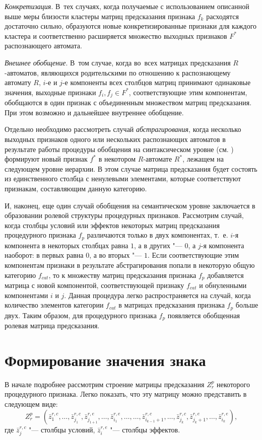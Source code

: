 \documentclass[a4paper, 12pt]{article}
\numberwithin{equation}{section}
\begin{document}
	\textit{Конкретизация}. В~тех случаях, когда получаемые с использованием описанной выше меры близости кластеры матриц предсказания признака $f_k$ расходятся достаточно сильно, образуются новые конкретизированные признаки для каждого кластера и соответственно расширяется множество выходных признаков $F^*$ распознающего автомата.
	
	\textit{Внешнее обобщение}. В~том случае, когда во~всех матрицах предсказания $R$-автоматов, являющихся родительскими по отношению к распознающему автомату $R$, $i$-е и $j$-е компоненты всех столбцов матриц принимают одинаковые значения, выходные признаки $f_i,f_j\in F^*$, соответствующие этим компонентам, обобщаются в один признак с объединенным множеством матриц предсказания. При этом возможно и дальнейшее внутреннее обобщение.
	
	Отдельно необходимо рассмотреть случай \textit{абстрагирования}, когда несколько выходных признаков одного или нескольких распознающих автоматов в результате работы процедуры обобщения на синтаксическом уровне (см. \cite{PanovA2014a}) формируют новый признак $f^*$ в некотором $R$-автомате $R^*$, лежащем на следующем уровне иерархии. В этом случае матрица предсказания будет состоять из единственного столбца с ненулевыми элементами, которые соответствуют признакам, составляющим данную категорию.
	
	И, наконец, еще один случай обобщения на семантическом уровне заключается в образовании ролевой структуры процедурных признаков. Рассмотрим случай, когда столбцы условий или эффектов некоторых матриц предсказания процедурного признака $f_p$ различаются только в двух компонентах, т.~е. $i$-я компонента в некоторых столбцах равна $1$, а в других "--- $0$, а $j$-я компонента наоборот: в первых равна $0$, а во вторых "--- $1$. Если соответствующие этим компонентам признаки в результате абстрагирования попали в некоторую общую категорию $f_{cat}$, то к множеству матриц предсказания признака $f_p$ добавляется матрица с новой компонентой, соответствующей признаку $f_{cat}$ и обнуленными компонентами $i$ и $j$. Данная процедура легко распространяется на случай, когда количество элементов категории $f_{cat}$ в матрицах предсказания признака $f_p$ больше двух. Таким образом, для процедурного признака $f_p$ появляется обобщенная ролевая матрица предсказания.

	\section{Формирование значения знака} \label{sect:link}
	В начале подробнее рассмотрим строение матрицы предсказания $Z_r^p$ некоторого процедурного признака. Легко показать, что эту матрицу можно представить в следующем виде:
	\begin{equation*}
	Z_r^p=(\bar z_1^{r,c},\dots,\bar z_{j_1}^{r,c},\bar z_{j_{1+1}}^{r,e},\dots,\bar z_{i_1}^{r,e},\dots,\dots,\bar z_{i_{k-1}+1}^{r,c},\dots,\bar z_{j_k}^{r,c},\bar z_{j_k+1}^{r,e},\dots,\bar z_{i_k}^{r,e}),
	\end{equation*}
	где $\bar z_j^{r,c}$ "--- столбцы условий, $\bar z_i^{r,e}$ "--- столбцы эффектов. 
	
\end{document}

